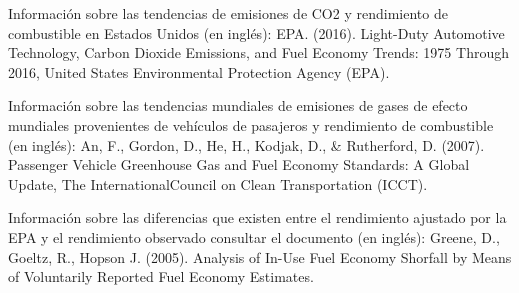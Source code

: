 \documentclass{article}
\begin{document}
\newpage




Información sobre las tendencias de emisiones de CO2 y rendimiento de combustible en Estados Unidos (en inglés):
EPA. (2016). Light-Duty Automotive Technology, Carbon Dioxide Emissions, and Fuel Economy Trends: 1975 Through 2016, United States Environmental Protection Agency (EPA).

Información sobre las tendencias mundiales de emisiones de gases de efecto mundiales provenientes de vehículos de pasajeros y rendimiento de combustible (en inglés):
An, F., Gordon, D., He, H., Kodjak, D., \& Rutherford, D. (2007). Passenger Vehicle Greenhouse Gas and Fuel Economy Standards: A Global Update, The InternationalCouncil on Clean Transportation (ICCT).

Información sobre las diferencias que existen entre el rendimiento ajustado por la EPA y el rendimiento observado consultar el documento (en inglés):
Greene, D., Goeltz, R., Hopson J. (2005). Analysis of In-Use Fuel Economy Shorfall by Means of Voluntarily Reported Fuel Economy Estimates.
\end{document}
